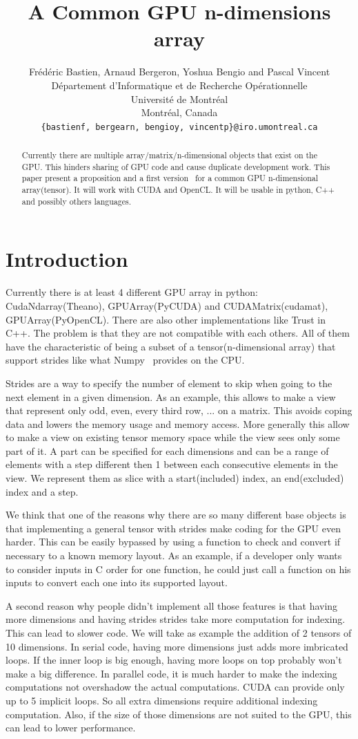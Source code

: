 \documentclass{article} %
\title{A Common GPU n-dimensions array}
\author{
Frédéric Bastien, Arnaud Bergeron, Yoshua Bengio and Pascal Vincent \\
D\'epartement d'Informatique et de Recherche Op\'erationnelle\\
Universit\'e de Montr\'eal\\
Montr\'eal, Canada \\
\texttt{\{bastienf, bergearn, bengioy, vincentp\}@iro.umontreal.ca} \\
}
\begin{document}
\maketitle

\begin{abstract}
Currently there are multiple array/matrix/n-dimensional objects
that exist on the GPU.  This hinders sharing of GPU code and cause
duplicate development work. This paper present a proposition and a
first version~\citep{GpuNdArray} for a common GPU n-dimensional
array(tensor). It will work with CUDA and OpenCL. It will be
usable in python, C++ and possibly others languages.
\end{abstract}

\section{Introduction}
Currently there is at least 4 different GPU array in python:
CudaNdarray(Theano), GPUArray(PyCUDA) and CUDAMatrix(cudamat),
GPUArray(PyOpenCL). There are also other implementations like Trust in
C++.  The problem is that they are not compatible with each
others. All of them have the characteristic of being a subset of a
tensor(n-dimensional array) that support strides like what
Numpy~\citep{numpy-2007} provides on the CPU.

Strides are a way to specify the number of element to skip when going
to the next element in a given dimension.  As an example, this allows
to make a view that represent only odd, even, every third row, ... on
a matrix. This avoids coping data and lowers the memory usage and memory
access. More generally this allow to make a view on existing tensor
memory space while the view sees only some part of it. A part can be
specified for each dimensions and can be a range of elements with a
step different then 1 between each consecutive elements in the
view. We represent them as slice with a start(included) index, an
end(excluded) index and a step.

We think that one of the reasons why there are so many different base
objects is that implementing a general tensor with strides
make coding for the GPU even harder. This can be easily bypassed by using
a function to check and convert if necessary to a known memory layout.
As an example, if a developer only wants to consider inputs in C order for one function, he could just call a function on his inputs to
convert each one into its supported layout.

A second reason why people didn't implement all those features is
that having more dimensions and having strides strides take more
computation for indexing. This can lead to slower code. We will take
as example the addition of 2 tensors of 10 dimensions. In serial code,
having more dimensions just adds more imbricated loops. If the inner
loop is big enough, having more loops on top probably won't make a big
difference. In parallel code, it is much harder to make the indexing computations not overshadow the actual computations. CUDA can
provide only up to 5 implicit loops. So all extra dimensions require
additional indexing computation. Also, if the size of those dimensions
are not suited to the GPU, this can lead to lower performance.
\end{document}
